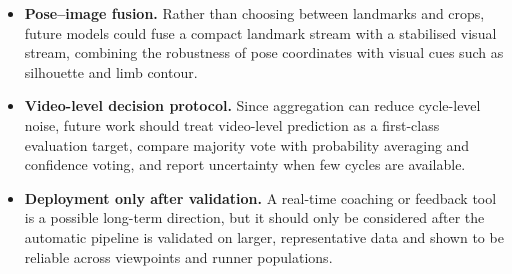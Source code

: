 \begin{itemize}
    \item \textbf{Pose--image fusion.} Rather than choosing between landmarks and
    crops, future models could fuse a compact landmark stream with a
    stabilised visual stream, combining the robustness of pose coordinates
    with visual cues such as silhouette and limb contour.
    
    \item \textbf{Video-level decision protocol.} Since aggregation can reduce
    cycle-level noise, future work should treat video-level prediction as a
    first-class evaluation target, compare majority vote with probability
    averaging and confidence voting, and report uncertainty when few cycles
    are available.
    
    \item \textbf{Deployment only after validation.} A real-time coaching or
    feedback tool is a possible long-term direction, but it should only be
    considered after the automatic pipeline is validated on larger,
    representative data and shown to be reliable across viewpoints and
    runner populations.
\end{itemize}


